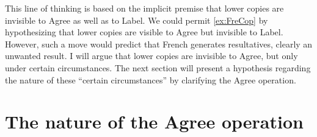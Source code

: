 \documentclass[MilwayThesis]{subfiles}
\begin{document}
This line of thinking is based on the implicit premise that lower copies are invisible to Agree as well as to Label.
We could permit \cref{ex:FreCop} by hypothesizing that lower copies are visible to Agree but invisible to Label.
However, such a move would predict that French generates resultatives, clearly an unwanted result.
I will argue that lower copies are invisible to Agree, but only under certain circumstances.
The next section will present a hypothesis regarding the nature of these ``certain circumstances'' by clarifying the Agree operation.

\section{The nature of the Agree operation}\label{sec:natureofagree}
\end{document}

